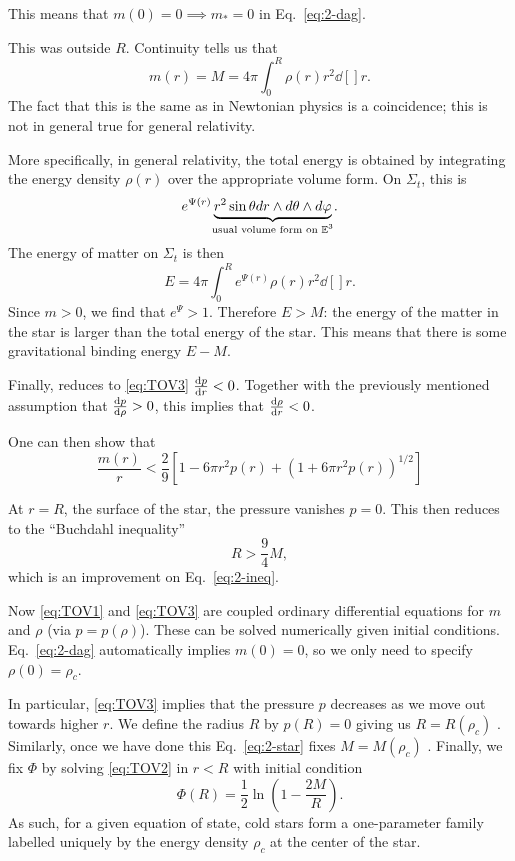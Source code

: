 This means that $m(0) = 0 \implies m_* = 0$ in Eq.~\eqref{eq:2-dag}.

This was outside $R$. Continuity tells us that
\begin{equation}
  m(r) = M = 4 \pi \int_0^R \rho(r) r^2 \dd[]{r} \label{eq:2-star}.
\end{equation}
The fact that this is the same as in Newtonian physics is a coincidence; this is not in general true for general relativity.

More specifically, in general relativity, the total energy is obtained by integrating the energy density $\rho(r)$ over the appropriate volume form. On $\Sigma_t$, this is
 \begin{equation}
  e^{\Psi(r)} \underbrace{r^2 \sin \theta dr \wedge d\theta \wedge d\varphi}_{\mathclap{\text{usual volume form on } \mathbb{E}^3}}.
\end{equation}
The energy of matter on $\Sigma_t$ is then
\begin{equation}
  E = 4 \pi \int_0^R e^{\Psi(r)} \rho(r)r^2 \dd[]{r}.
\end{equation}
Since $m > 0$, we find that $e^{\Psi} > 1$.
Therefore $E > M$: the energy of the matter in the star is larger than the total energy of the star.
This means that there is some gravitational binding energy $E - M$.

Finally, reduces to \eqref{eq:TOV3} $\dv{p}{r} < 0$. Together with the previously mentioned assumption that $\dv{p}{\rho} > 0$, this implies that $\dv{\rho}{r} < 0$.
\begin{exercise}[Sheet 1]
  One can then show that
  \begin{equation}
    \frac{m(r)}{r} < \frac{2}{9} \left[ 1 - 6 \pi r^2 p(r) + (1 + 6 \pi r^2 p(r))^{1 / 2} \right] \label{eq:2-doubstar}
  \end{equation}
\end{exercise}
At $r = R$, the surface of the star, the pressure vanishes $p = 0$. This then reduces to the ``Buchdahl inequality''
\begin{equation}
  R > \frac{9}{4} M,
\end{equation}
which is an improvement on Eq.~\eqref{eq:2-ineq}.

Now \eqref{eq:TOV1} and \eqref{eq:TOV3} are coupled ordinary differential equations for $m$ and $\rho$ (via $p = p(\rho)$).
These can be solved numerically given initial conditions. Eq.~\eqref{eq:2-dag} automatically implies $m(0) = 0 $, so we only need to specify $\rho(0) = \rho_c$.

In particular, \eqref{eq:TOV3} implies that the pressure  $p$  decreases as we move out towards higher $r$.
We define the radius  $R$  by $p(R) = 0$  giving us $R = R(\rho_c)$ . Similarly, once we have done this Eq.~\eqref{eq:2-star} fixes $M = M(\rho_c)$ . Finally, we fix $\Phi$ by solving  \eqref{eq:TOV2} in $r < R$ with initial condition
 \begin{equation}
  \Phi(R) = \frac{1}{2} \ln(1 - \frac{2M}{R}).
\end{equation}
As such, for a given equation of state, cold stars form a one-parameter family labelled uniquely by the energy density $\rho_c$ at the center of the star.

